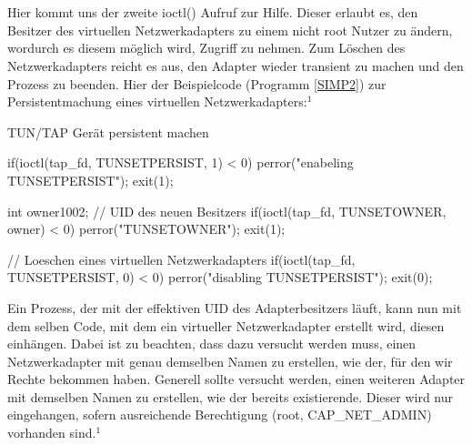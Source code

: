 \\\\
Hier kommt uns der zweite ioctl() Aufruf zur Hilfe. Dieser erlaubt es, den Besitzer des virtuellen Netzwerkadapters zu einem nicht root Nutzer zu ändern, wordurch es diesem möglich wird, Zugriff zu nehmen. Zum Löschen des Netzwerkadapters reicht es aus, den Adapter wieder transient zu machen und den Prozess zu beenden. Hier der Beispielcode (Programm \ref{SIMP2}) zur Persistentmachung eines virtuellen Netzwerkadapters:$^{1}$
\begin{program}[H]
    \caption{TUN/TAP Gerät persistent machen}
    \label{SIMP2}
    \begin{CppCode}
if(ioctl(tap_fd, TUNSETPERSIST, 1) < 0){
    perror("enabeling TUNSETPERSIST");
    exit(1);
}

int owner{1002}; // UID des neuen Besitzers
if(ioctl(tap_fd, TUNSETOWNER, owner) < 0){
    perror("TUNSETOWNER");
    exit(1);
}

// Loeschen eines virtuellen Netzwerkadapters
if(ioctl(tap_fd, TUNSETPERSIST, 0) < 0){
    perror("disabling TUNSETPERSIST");
}
exit(0);
    \end{CppCode}
\end{program}
\noindent
Ein Prozess, der mit der effektiven UID des Adapterbesitzers läuft, kann nun mit dem selben Code, mit dem ein virtueller Netzwerkadapter erstellt wird, diesen einhängen. Dabei ist zu beachten, dass dazu versucht werden muss, einen Netzwerkadapter mit genau demselben Namen zu erstellen, wie der, für den wir Rechte bekommen haben. Generell sollte versucht werden, einen weiteren Adapter mit demselben Namen zu erstellen, wie der bereits existierende. Dieser wird nur eingehangen, sofern ausreichende Berechtigung (root, CAP\_NET\_ADMIN) vorhanden sind.$^{1}$

\newpage
